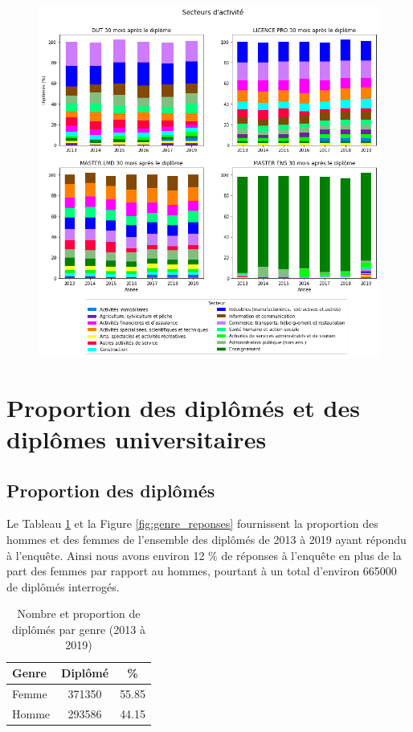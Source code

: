 \documentclass[12pt, a4paper, titlepage, table]{article}
\begin{document}
	\begin{figure}[H]
		\centering
		\includegraphics[width=1\textwidth]{../graphs/repartition_secteurs_situation.png}
	\end{figure}

\section{Proportion des diplômés et des diplômes universitaires}

	\subsection{Proportion des diplômés}
	Le Tableau \ref{tab:genre_responses} et la Figure \ref{fig:genre_reponses} fournissent la proportion des hommes et des femmes de l'ensemble des diplômés de 2013 à 2019 ayant répondu à l'enquête. Ainsi nous avons environ 12 \% de réponses à l'enquête en plus de la part des femmes par rapport au hommes, pourtant à un total d'environ 665000 de diplômés interrogés.
		\begin{table}[H]
			\centering
			\begin{tabular}{lcc}
				\toprule
				\textbf{Genre} & \textbf{Diplômé} & \textbf{\%} \\
				\midrule
				Femme & 371350 & 55.85 \\
				Homme & 293586 & 44.15 \\
				\bottomrule
			\end{tabular}
			\caption{Nombre et proportion de diplômés par genre (2013 à 2019)}
			\label{tab:genre_responses}
		\end{table}
	
\end{document}
